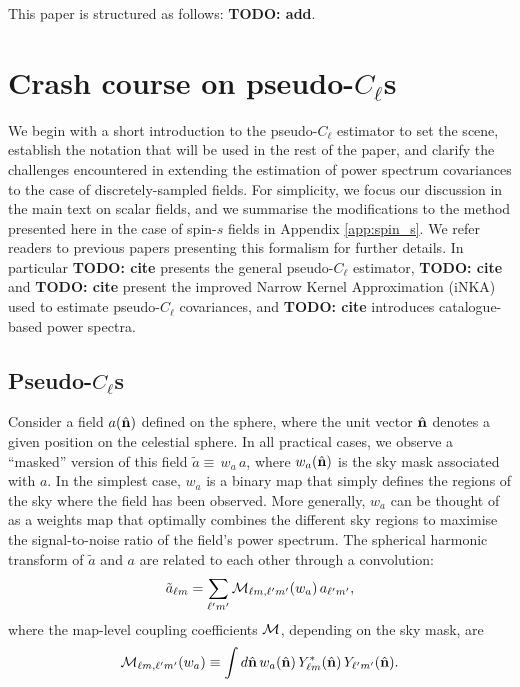 \documentclass[aps,twocolumn, superscriptaddress, english, nofootinbib, 10pt]{revtex4-2}
\newcommand{\nv}{\hat{\bf n}}
\newcommand{\todo}[1]{{\color{blue}\bf TODO: #1}}
\begin{document}
    This paper is structured as follows: \todo{add}.

\section{Crash course on pseudo-$C_\ell$s}\label{sec:pcls}
  We begin with a short introduction to the pseudo-$C_\ell$ estimator to set the scene, establish the notation that will be used in the rest of the paper, and clarify the challenges encountered in extending the estimation of power spectrum covariances to the case of discretely-sampled fields. For simplicity, we focus our discussion in the main text on scalar fields, and we summarise the modifications to the method presented here in the case of spin-$s$ fields in Appendix \ref{app:spin_s}. We refer readers to previous papers presenting this formalism for further details. In particular \todo{cite} presents the general pseudo-$C_\ell$ estimator, \todo{cite} and \todo{cite} present the improved Narrow Kernel Approximation (iNKA) used to estimate pseudo-$C_\ell$ covariances, and \todo{cite} introduces catalogue-based power spectra.

  \subsection{Pseudo-$C_\ell$s}\label{ssec:pcls.pcl}
    Consider a field $a(\nv)$ defined on the sphere, where the unit vector $\nv$ denotes a given position on the celestial sphere. In all practical cases, we observe a ``masked'' version of this field $\tilde{a}\equiv\,w_a\,a$, where $w_a(\nv)$ is the sky mask associated with $a$. In the simplest case, $w_a$ is a binary map that simply defines the regions of the sky where the field has been observed. More generally, $w_a$ can be thought of as a weights map that optimally combines the different sky regions to maximise the signal-to-noise ratio of the field's power spectrum. The spherical harmonic transform of $\tilde{a}$ and $a$ are related to each other through a convolution:
    \begin{equation}\label{eq:mask_harmonic}
      \tilde{a}_{\ell m}=\sum_{\ell'm'}{\cal M}_{\ell m,\ell'm'}(w_a)\,a_{\ell'm'},
    \end{equation}
    where the map-level coupling coefficients ${\cal M}$, depending on the sky mask, are
    \begin{equation}\label{eq:map_mcm}
      {\cal M}_{\ell m,\ell'm'}(w_a)\equiv\int d\nv\,w_a(\nv)\,Y^*_{\ell m}(\nv)\,Y_{\ell'm'}(\nv).
    \end{equation}
\end{document}
